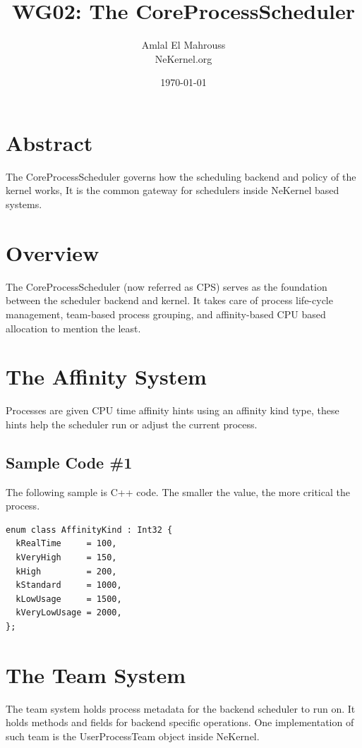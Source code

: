 \documentclass[11pt, a4paper]{article}
\title{WG02: The CoreProcessScheduler}
\author{Amlal El Mahrouss\\NeKernel.org}
\date{\today}
\begin{document}
\maketitle

\section{Abstract}

{The CoreProcessScheduler governs how the scheduling backend and policy of the kernel works, It is the common gateway for schedulers inside NeKernel based systems.}

\section{Overview}

{The CoreProcessScheduler (now referred as CPS) serves as the foundation between the scheduler backend and kernel.} {It takes care of process life-cycle management, team-based process grouping, and affinity-based CPU based allocation to mention the least.}

\section{The Affinity System}

{Processes are given CPU time affinity hints using an affinity kind type, these hints help the scheduler run or adjust the current process.}

\subsection{Sample Code \#1}

{The following sample is C++ code.} {The smaller the value, the more critical the process.}

\begin{lstlisting}
enum class AffinityKind : Int32 {
  kRealTime     = 100,
  kVeryHigh     = 150,
  kHigh         = 200,
  kStandard     = 1000,
  kLowUsage     = 1500,
  kVeryLowUsage = 2000,
};
\end{lstlisting}

\section{The Team System}

{The team system holds process metadata for the backend scheduler to run on. It holds methods and fields for backend specific operations.} {One implementation of such team is the UserProcessTeam object inside NeKernel.}
\end{document}
